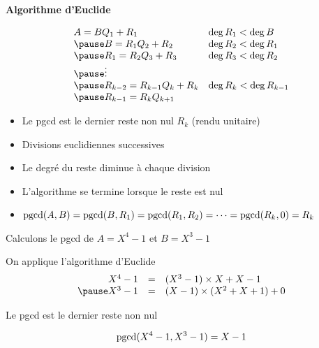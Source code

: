 \begin{frame}
\textbf{Algorithme d'Euclide}

\pause

$$\begin{array}{ll}
A = B Q_1+R_1 \quad \quad & \deg R_1 < \deg B \\
\pause
B = R_1 Q_2 + R_2  & \deg R_2 < \deg R_1 \\
\pause
R_1=R_2Q_3+R_3 & \deg R_3 < \deg R_2 \\
\pause
\vdots & \\
\pause
R_{k-2}=R_{k-1}Q_{k}+R_k  & \deg R_k < \deg R_{k-1} \\
\pause
R_{k-1}=R_kQ_{k+1} & \\
\end{array}$$

\pause

\begin{itemize}[<+->]
  \item Le pgcd est le dernier reste non nul $R_k$ (rendu unitaire)
  \item Divisions euclidiennes successives
  \item Le degré du reste diminue à chaque division
  \item L'algorithme se termine lorsque le reste est nul
  \item {\small $\mathop{\text{pgcd}}\nolimits(A,B)=\mathop{\text{pgcd}}\nolimits(B,R_1)=\mathop{\text{pgcd}}\nolimits(R_1,R_2)=\cdots =\mathop{\text{pgcd}}\nolimits(R_k,0)=R_k$}
\end{itemize}

\end{frame}


\begin{frame}
\begin{exemple}
Calculons le pgcd de  $A=X^4-1$ et $B=X^3-1$

\pause
\medskip

On applique l'algorithme d'Euclide
$$\begin{array}{rcl}
X^4-1 & = & (X^3-1) \times X + X-1 \\
\pause
X^3-1 & = & (X-1)\times (X^2+X+1) + 0 \\
\end{array}$$

\pause
\medskip

Le pgcd est le dernier reste non nul

$$\mathop{\text{pgcd}}\nolimits(X^4-1, X^3-1)=X-1$$
\end{exemple}
\end{frame}


